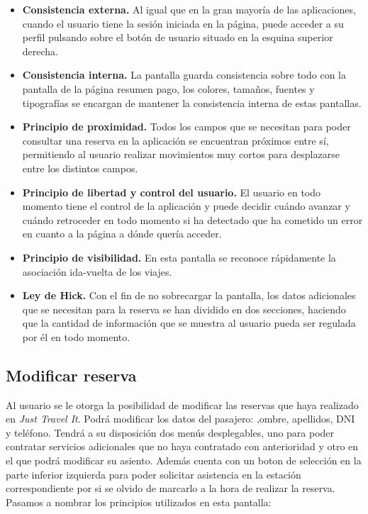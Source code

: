 \begin{itemize}
    \item \textbf{Consistencia externa.} Al igual que en la gran mayoría de las aplicaciones, cuando el usuario
        tiene la sesión iniciada en la página, puede acceder a su perfil pulsando sobre el botón de usuario situado
        en la esquina superior derecha.
    \item \textbf{Consistencia interna.} La pantalla guarda consistencia sobre todo con la pantalla de la página
        resumen pago, los colores, tamaños, fuentes y tipografías se encargan de mantener la consistencia interna
        de estas pantallas.
    \item \textbf{Principio de proximidad.} Todos los campos que se necesitan para poder consultar una reserva en
        la aplicación se encuentran próximos entre sí, permitiendo al usuario realizar movimientos muy cortos para
        desplazarse entre los distintos campos.
    \item \textbf{Principio de libertad y control del usuario.} El usuario en todo momento tiene el control de la
        aplicación y puede decidir cuándo avanzar y cuándo retroceder en todo momento si ha detectado que ha cometido
        un error en cuanto a la página a dónde quería acceder.
    \item \textbf{Principio de visibilidad.} En esta pantalla se reconoce rápidamente la asociación ida-vuelta de los
        viajes.
    \item \textbf{Ley de Hick.} Con el fin de no sobrecargar la pantalla, los datos adicionales que se necesitan para
        la reserva se han dividido en dos secciones, haciendo que la cantidad de información que se muestra al
        usuario pueda ser regulada por él en todo momento.
\end{itemize}

\subsection*{Modificar reserva}

Al usuario se le otorga la posibilidad de modificar las reservas que haya realizado en \textit{Just Travel It}. Podrá
modificar los datos del pasajero: ,ombre, apellidos, DNI y teléfono. Tendrá a su disposición dos menús desplegables,
uno para poder contratar servicios adicionales que no haya contratado con anterioridad y otro en el que podrá
modificar su asiento. Además cuenta con un boton de selección en la parte inferior izquierda para poder solicitar
asistencia en la estación correspondiente por si se olvido de marcarlo a la hora de realizar la reserva. Pasamos
a nombrar los principios utilizados en esta pantalla:

